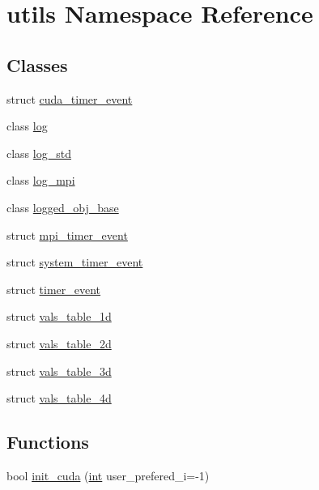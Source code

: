 \hypertarget{namespaceutils}{\section{utils Namespace Reference}
\label{namespaceutils}
}
\subsection*{Classes}
\begin{DoxyCompactItemize}
\item 
struct \hyperlink{structutils_1_1cuda__timer__event}{cuda\-\_\-timer\-\_\-event}
\item 
class \hyperlink{classutils_1_1log}{log}
\item 
class \hyperlink{classutils_1_1log__std}{log\-\_\-std}
\item 
class \hyperlink{classutils_1_1log__mpi}{log\-\_\-mpi}
\item 
class \hyperlink{classutils_1_1logged__obj__base}{logged\-\_\-obj\-\_\-base}
\item 
struct \hyperlink{structutils_1_1mpi__timer__event}{mpi\-\_\-timer\-\_\-event}
\item 
struct \hyperlink{structutils_1_1system__timer__event}{system\-\_\-timer\-\_\-event}
\item 
struct \hyperlink{structutils_1_1timer__event}{timer\-\_\-event}
\item 
struct \hyperlink{structutils_1_1vals__table__1d}{vals\-\_\-table\-\_\-1d}
\item 
struct \hyperlink{structutils_1_1vals__table__2d}{vals\-\_\-table\-\_\-2d}
\item 
struct \hyperlink{structutils_1_1vals__table__3d}{vals\-\_\-table\-\_\-3d}
\item 
struct \hyperlink{structutils_1_1vals__table__4d}{vals\-\_\-table\-\_\-4d}
\end{DoxyCompactItemize}
\subsection*{Functions}
\begin{DoxyCompactItemize}
\item 
bool \hyperlink{namespaceutils_acd1c75c1806c282769faabc87cfa93dc}{init\-\_\-cuda} (\hyperlink{classint}{int} user\-\_\-prefered\-\_\-i=-\/1)
\end{DoxyCompactItemize}


